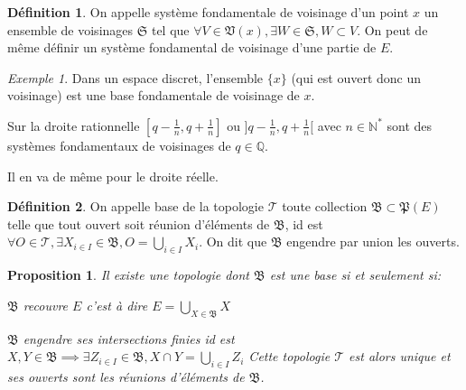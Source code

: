 \documentclass[a4paper, 11pt, french]{book}
\newenvironment{itemise}{\itemize}{\enditemize}
\theoremstyle{plain} %
\newtheorem{proposition}{Proposition}
\theoremstyle{definition} %
\newtheorem{definition}{Définition}
\theoremstyle{remark} %
\newtheorem{exemple}{Exemple}
\newcommand{\1}{\mathds{1}}
\newcommand{\N}{\mathbb{N}}
\newcommand{\Q}{\mathbb{Q}}
\begin{document}
\begin{definition}
	On appelle système fondamentale de voisinage d'un point $x$ un ensemble de voisinages $\mathfrak{S}$ tel que $\forall V\in\mathfrak{V}(x), \exists W\in\mathfrak{S}, W\subset V$. On peut de même définir un système fondamental de voisinage d'une partie de $E$.
\end{definition}

\begin{exemple}
	\begin{itemise}
		\item Dans un espace discret, l'ensemble $\{x\}$ (qui est ouvert donc un voisinage) est une base fondamentale de voisinage de $x$.
		\item Sur la droite rationnelle $[q-\frac{1}{n}, q+\frac{1}{n}]$ ou $]q-\frac{1}{n}, q+\frac{1}{n}[$ avec $n\in\N^*$ sont des systèmes fondamentaux de voisinages de $q\in\Q$.
		\item Il en va de même pour le droite réelle.
	\end{itemise}
\end{exemple}

\begin{definition}
	On appelle base de la topologie $\mathscr{T}$ toute collection $\mathfrak{B}\subset\mathfrak{P}(E)$ telle que tout ouvert soit réunion d'éléments de $\mathfrak{B}$, id est $\forall O\in\mathscr{T}, \exists X_{i\in I}\in\mathfrak{B}, O=\bigcup_{i\in I} X_i$.
	On dit que $\mathfrak{B}$ engendre par union les ouverts.
\end{definition}

\begin{proposition}
	Il existe une topologie dont $\mathfrak{B}$ est une base si et seulement si:
	\begin{itemise}
		\item $\mathfrak{B}$ recouvre $E$ c'est à dire $E=\bigcup_{X\in\mathfrak{B}}X$
		\item $\mathfrak{B}$ engendre ses intersections finies id est $X, Y\in\mathfrak{B}\implies\exists Z_{i\in I}\in\mathfrak{B}, X\cap Y=\bigcup_{i\in I}Z_i$
	\end{itemise}
	Cette topologie $\mathscr{T}$ est alors unique et ses ouverts sont les réunions d'éléments de $\mathfrak{B}$.
\end{proposition}
\end{document}
